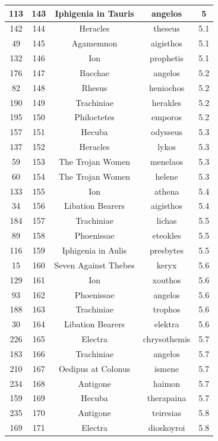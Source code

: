 \documentclass{jcls}
\begin{document}
\begin{longtable}{|c|c|c|c|c|}
  113 & 143 & Iphigenia in Tauris & angelos & 5 \\ \hline
  142 & 144 & Heracles & theseus & 5.1 \\ \hline
  49 & 145 & Agamemnon & aigisthos & 5.1 \\ \hline
  132 & 146 & Ion & prophetis & 5.1 \\ \hline
  176 & 147 & Bacchae & angelos & 5.2 \\ \hline
  82 & 148 & Rhesus & heniochos & 5.2 \\ \hline
  190 & 149 & Trachiniae & herakles & 5.2 \\ \hline
  195 & 150 & Philoctetes & emporos & 5.2 \\ \hline
  157 & 151 & Hecuba & odysseus & 5.3 \\ \hline
  137 & 152 & Heracles & lykos & 5.3 \\ \hline
  59 & 153 & The Trojan Women & menelaos & 5.3 \\ \hline
  60 & 154 & The Trojan Women & helene & 5.3 \\ \hline
  133 & 155 & Ion & athena & 5.4 \\ \hline
  34 & 156 & Libation Bearers & aigisthos & 5.4 \\ \hline
  184 & 157 & Trachiniae & lichas & 5.5 \\ \hline
  89 & 158 & Phoenissae & eteokles & 5.5 \\ \hline
  116 & 159 & Iphigenia in Aulis & presbytes & 5.5 \\ \hline
  15 & 160 & Seven Against Thebes & keryx & 5.6 \\ \hline
  129 & 161 & Ion & xouthos & 5.6 \\ \hline
  93 & 162 & Phoenissae & angelos & 5.6 \\ \hline
  188 & 163 & Trachiniae & trophos & 5.6 \\ \hline
  30 & 164 & Libation Bearers & elektra & 5.6 \\ \hline
  226 & 165 & Electra & chrysothemis & 5.7 \\ \hline
  183 & 166 & Trachiniae & angelos & 5.7 \\ \hline
  210 & 167 & Oedipus at Colonus & ismene & 5.7 \\ \hline
  234 & 168 & Antigone & haimon & 5.7 \\ \hline
  159 & 169 & Hecuba & therapaina & 5.7 \\ \hline
  235 & 170 & Antigone & teiresias & 5.8 \\ \hline
  169 & 171 & Electra & dioskoyroi & 5.8 \\ \hline

\end{longtable}
\end{document}
